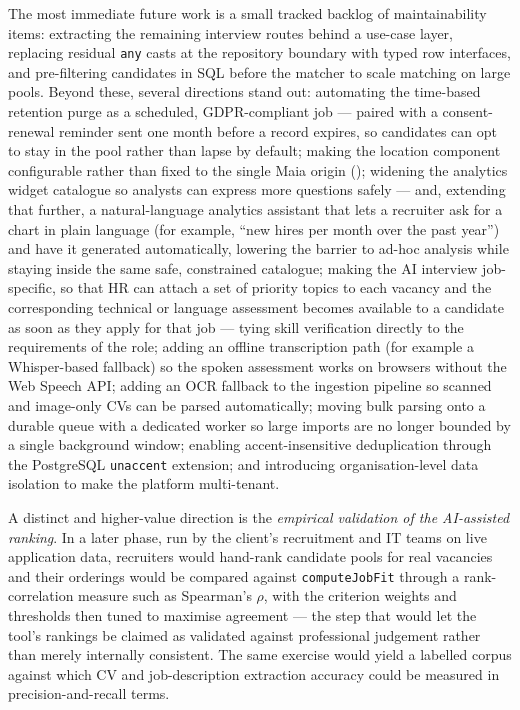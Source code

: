 The most immediate future work is a small tracked backlog of maintainability
items: extracting the remaining interview routes behind a use-case layer,
replacing residual \texttt{any} casts at the repository boundary with typed
row interfaces, and pre-filtering candidates in SQL before the matcher to
scale matching on large pools. Beyond these, several directions stand out:
automating the time-based retention purge as a scheduled, GDPR-compliant job
--- paired with a consent-renewal reminder sent one month before a record
expires, so candidates can opt to stay in the pool rather than lapse by
default; making the location component configurable rather than fixed to the
single Maia origin (); widening
the analytics widget catalogue so analysts can express more questions safely
--- and, extending that further, a natural-language analytics assistant that
lets a recruiter ask for a chart in plain language (for example, ``new hires
per month over the past year'') and have it generated automatically, lowering
the barrier to ad-hoc analysis while staying inside the same safe, constrained
catalogue; making the AI interview job-specific, so that HR can attach a set of
priority topics to each vacancy and the corresponding technical or language
assessment becomes available to a candidate as soon as they apply for that job
--- tying skill verification directly to the requirements of the role; adding an
offline transcription path (for example a Whisper-based fallback)
so the spoken assessment works on browsers without the Web Speech API; adding
an OCR fallback to the ingestion pipeline so scanned and image-only CVs can be
parsed automatically; moving bulk parsing onto a durable queue with a
dedicated worker so large imports are no longer bounded by a single background
window; enabling accent-insensitive deduplication through the PostgreSQL
\texttt{unaccent} extension; and
introducing organisation-level data isolation to make the platform
multi-tenant.

A distinct and higher-value direction is the \emph{empirical validation of the
AI-assisted ranking}. In a later phase, run by the client's recruitment and IT
teams on live application data, recruiters would hand-rank candidate pools for
real vacancies and their orderings would be compared against
\texttt{computeJobFit} through a rank-correlation measure such as Spearman's
$\rho$, with the criterion weights and thresholds then tuned to maximise
agreement --- the step that would let the tool's rankings be claimed as
validated against professional judgement rather than merely internally
consistent. The same exercise would yield a labelled corpus against which CV
and job-description extraction accuracy could be measured in
precision-and-recall terms.

